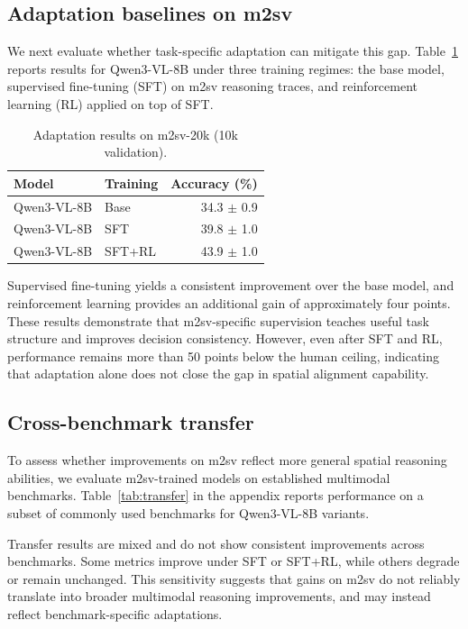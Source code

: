 \documentclass{article}
\begin{document}
\subsection{Adaptation baselines on m2sv}
\label{sec:results-adaptation}

We next evaluate whether task-specific adaptation can mitigate this gap.
Table~\ref{tab:m2sv-main-results} reports results for Qwen3-VL-8B under three
training regimes: the base model, supervised fine-tuning (SFT) on m2sv reasoning
traces, and reinforcement learning (RL) applied on top of SFT.

\begin{table}[t]
  \centering
  \caption{Adaptation results on m2sv-20k (10k validation).}
  \label{tab:m2sv-main-results}
  \begin{tabular}{l l r}
    \toprule
    Model & Training & Accuracy (\%) \\
    \midrule
    Qwen3-VL-8B & Base & 34.3 $\pm$ 0.9 \\
    Qwen3-VL-8B & SFT & 39.8 $\pm$ 1.0 \\
    Qwen3-VL-8B & SFT+RL & 43.9 $\pm$ 1.0 \\
    \bottomrule
  \end{tabular}
\end{table}

Supervised fine-tuning yields a consistent improvement over the base model, and
reinforcement learning provides an additional gain of approximately four points.
These results demonstrate that m2sv-specific supervision teaches useful task
structure and improves decision consistency. However, even after SFT and RL,
performance remains more than 50 points below the human ceiling, indicating that
adaptation alone does not close the gap in spatial alignment capability.

\subsection{Cross-benchmark transfer}
\label{sec:results-transfer}

To assess whether improvements on m2sv reflect more general spatial reasoning
abilities, we evaluate m2sv-trained models on established multimodal benchmarks.
Table~\ref{tab:transfer} in the appendix reports performance on a subset of commonly used
benchmarks for Qwen3-VL-8B variants.



Transfer results are mixed and do not show consistent improvements across
benchmarks. Some metrics improve under SFT or SFT+RL, while others degrade or
remain unchanged. This sensitivity suggests that gains on m2sv do not reliably
translate into broader multimodal reasoning improvements, and may instead reflect
benchmark-specific adaptations.
\end{document}
